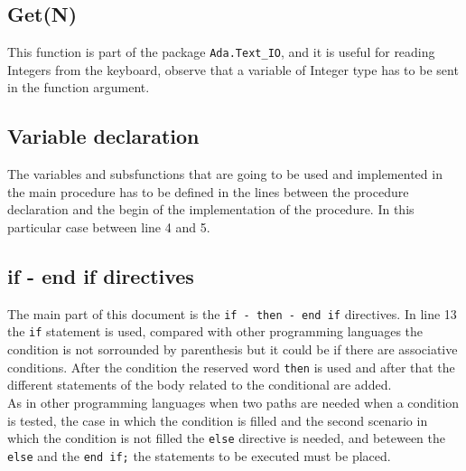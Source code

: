 \documentclass[paper=a4, fontsize=11pt]{scrartcl} %
\numberwithin{equation}{section} %
\numberwithin{figure}{section} %
\numberwithin{table}{section} %
\begin{document}
\subsection{Get(N)}
This function is part of the package \verb|Ada.Text_IO|, and it is useful for reading Integers from the keyboard, observe that a variable of Integer type has to be sent in the function argument. 

\subsection{Variable declaration}
The variables and subsfunctions that are going to be used and implemented in the main procedure has to be defined in the lines between the procedure declaration and the begin of the implementation of the procedure. In this particular case between line 4 and 5.

\subsection{if - end if  directives}
The main part of this document is the \verb|if - then - end if| directives. In line 13 the \verb|if| statement is used, compared with other programming languages the condition is not sorrounded by parenthesis but it could be if there are associative conditions. After the condition the reserved word \verb|then| is used and after that the different statements of the body related to the conditional are added.\\

As in other programming languages when two paths are needed when a condition is tested, the case in which the condition is filled and the second scenario in which the condition is not filled the \verb|else| directive is needed, and beteween the \verb|else| and the \verb|end if;| the statements to be executed must be placed. 
\end{document}
